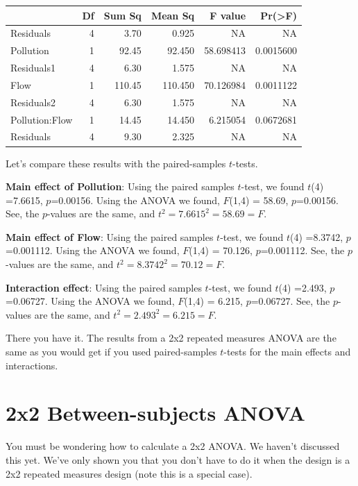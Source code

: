 \documentclass[
  letterpaper,
  DIV=11,
  numbers=noendperiod]{scrreprt}
\begin{document}
\begin{tabular}{l|r|r|r|r|r}
\hline
  & Df & Sum Sq & Mean Sq & F value & Pr(>F)\\
\hline
Residuals & 4 & 3.70 & 0.925 & NA & NA\\
\hline
Pollution & 1 & 92.45 & 92.450 & 58.698413 & 0.0015600\\
\hline
Residuals1 & 4 & 6.30 & 1.575 & NA & NA\\
\hline
Flow & 1 & 110.45 & 110.450 & 70.126984 & 0.0011122\\
\hline
Residuals2 & 4 & 6.30 & 1.575 & NA & NA\\
\hline
Pollution:Flow & 1 & 14.45 & 14.450 & 6.215054 & 0.0672681\\
\hline
Residuals & 4 & 9.30 & 2.325 & NA & NA\\
\hline
\end{tabular}

Let's compare these results with the paired-samples \(t\)-tests.

\textbf{Main effect of Pollution}: Using the paired samples \(t\)-test,
we found \(t\)(4) =7.6615, \(p\)=0.00156. Using the ANOVA we found,
\(F\)(1,4) = 58.69, \(p\)=0.00156. See, the \(p\)-values are the same,
and \(t^2 = 7.6615^2 = 58.69 = F\).

\textbf{Main effect of Flow}: Using the paired samples \(t\)-test, we
found \(t\)(4) =8.3742, \(p\)=0.001112. Using the ANOVA we found,
\(F\)(1,4) = 70.126, \(p\)=0.001112. See, the \(p\)-values are the same,
and \(t^2 = 8.3742^2 = 70.12 = F\).

\textbf{Interaction effect}: Using the paired samples \(t\)-test, we
found \(t\)(4) =2.493, \(p\)=0.06727. Using the ANOVA we found,
\(F\)(1,4) = 6.215, \(p\)=0.06727. See, the \(p\)-values are the same,
and \(t^2 = 2.493^2 = 6.215 = F\).

There you have it. The results from a 2x2 repeated measures ANOVA are
the same as you would get if you used paired-samples \(t\)-tests for the
main effects and interactions.

\section{2x2 Between-subjects ANOVA}\label{x2-between-subjects-anova}

You must be wondering how to calculate a 2x2 ANOVA. We haven't discussed
this yet. We've only shown you that you don't have to do it when the
design is a 2x2 repeated measures design (note this is a special case).
\end{document}

